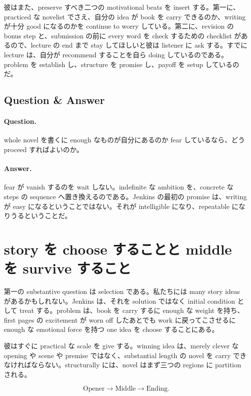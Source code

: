 彼はまた、preserve すべき二つの motivational beats を insert する。第一に、practiced な novelist でさえ、自分の idea が book を carry できるのか、writing が十分 good になるのかを continue to worry している。第二に、revision の bonus step と、submission の前に every word を check するための checklist があるので、lecture の end まで stay してほしいと彼は listener に ask する。すでに lecture は、自分が recommend することを自ら doing しているのである。problem を establish し、structure を promise し、payoff を setup しているのだ。

\subsection{Question \& Answer}

\paragraph{Question.} whole novel を書くに enough なものが自分にあるのか fear しているなら、どう proceed すればよいのか。

\paragraph{Answer.} fear が vanish するのを wait しない。indefinite な ambition を、concrete な steps の sequence へ置き換えるのである。Jenkins の最初の promise は、writing が easy になるということではない。それが intelligible になり、repeatable になりうるということだ。

\section{story を choose することと middle を survive すること}

第一の substantive question は selection である。私たちには many story ideas があるかもしれない。Jenkins は、それを solution ではなく initial condition として treat する。problem は、book を carry するに enough な weight を持ち、first pages の excitement が worn off したあとでも work に戻ってこさせるに enough な emotional force を持つ one idea を choose することにある。

彼はすぐに practical な scale を give する。winning idea は、merely clever な opening や scene や premise ではなく、substantial length の novel を carry できなければならない。structurally には、novel はまず三つの regions に partition される。

\begin{equation}
\text{Opener} \to \text{Middle} \to \text{Ending}.
\end{equation}

